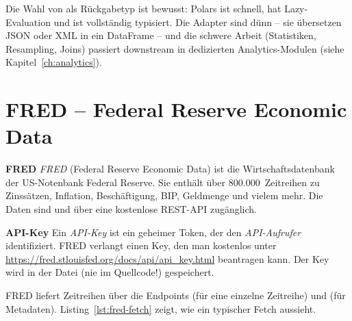 Die Wahl von  als Rückgabetyp ist
bewusst: Polars ist schnell, hat Lazy-Evaluation und ist vollständig
typisiert. Die Adapter sind dünn -- sie übersetzen JSON oder XML in
ein DataFrame -- und die schwere Arbeit (Statistiken, Resampling,
Joins) passiert downstream in dedizierten Analytics-Modulen
(siehe Kapitel~\ref{ch:analytics}).

\section{FRED -- Federal Reserve Economic Data}

\begin{definition}
\textbf{FRED}
\emph{FRED} (Federal Reserve Economic Data) ist die
Wirtschaftsdatenbank der US-Notenbank Federal Reserve. Sie enthält
über 800.000~Zeitreihen zu Zinssätzen, Inflation, Beschäftigung,
BIP, Geldmenge und vielem mehr. Die Daten sind 
und über eine kostenlose REST-API zugänglich.
\end{definition}

\begin{definition}
\textbf{API-Key}
Ein \emph{API-Key} ist ein geheimer Token, der den
\emph{API-Aufrufer} identifiziert. FRED verlangt einen Key, den man
kostenlos unter \url{https://fred.stlouisfed.org/docs/api/api_key.html}
beantragen kann. Der Key wird in der Datei  (nie im
Quellcode!) gespeichert.
\end{definition}

FRED liefert Zeitreihen über die Endpoints
 (für eine einzelne Zeitreihe) und
 (für Metadaten). Listing~\ref{lst:fred-fetch}
zeigt, wie ein typischer Fetch aussieht.

